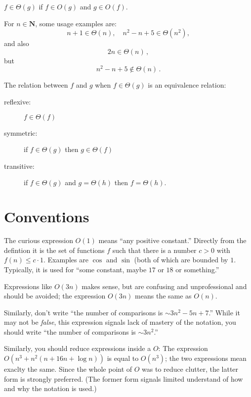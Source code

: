\documentclass{tstextbook}
\begin{document}
\begin{definition}
  $f\in \Theta(g)$ if $f\in O(g)$ and $g\in O(f)$.
\end{definition}

\begin{example}
  For $n\in \mathbf N$, some usage examples are:
\[ n + 1 \in \Theta(n), \quad n^2 - n + 5 \in \Theta( n^2), \] 
and also
\[ 2n \in \Theta ( n)\,,\]
but  
\[ n^2 - n + 5 \notin  \Theta(n)\,. \] 
\end{example}

\begin{theorem}[as a relation]
  \label{thm: Oh as a relation}
The relation between \(f\) and \(g\) when \(f\in \Theta(g)\) is an equivalence relation:
  \begin{description}
    \item[reflexive:] \( f \in \Theta(f)\)
    \item[symmetric:] if \( f \in \Theta(g)\) then \(g \in \Theta(f)\)
    \item[transitive:] if \( f\in \Theta ( g)\)  and   \(g= \Theta(h)\) then \(f= \Theta( h)\).
  \end{description}
\end{theorem}



\section{Conventions}


The curious expression \(O(1)\) means “any positive constant.” 
Directly from the defintion it is the set of functions $f$ such that there is a number $c>0$ with $f(n)\leq c\cdot 1$.
Examples are $\cos$ and $\sin$ (both of which are bounded by $1$.
Typically, it is used for ``some constant, maybe $17$ or $18$ or something.''

Expressions like $O(3n)$ makes sense, but are confusing and unprofessional and should be avoided; the expression $O(3n)$ means the same as $O(n)$.

Similarly, don’t write ``the number of comparisons is $\sim 3n^2  - 5n +7$.''
While it may not be \emph{false}, this expression signals lack of mastery of the notation, you should write
``the number of comparisons is $\sim 3n^2$.''

Similarly, you should reduce expressions inside a $O$:
The expression $O(n^3 + n^2(n + 16n + \log n))$ is equal to $O(n^3)$;
the two expressions mean exaclty the same.
Since the whole point of $O$ was to reduce clutter, the latter form is strongly preferred.
(The former form signals limited understand of how and why the notation is used.)
\end{document}
